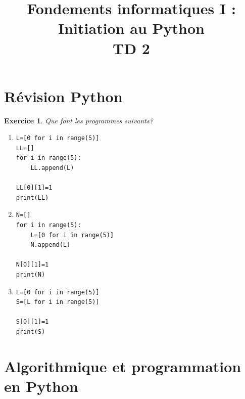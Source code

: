 \documentclass[11pt]{article}
\title{Fondements informatiques I : Initiation au  Python\\
TD 2}
\newcommand{\correction}{
\renewenvironment{note}{
~\hspace*{-0.1cm} \hrulefill\\ \textbf{Notes.}~\\
}
{
~\hspace*{-0.1cm} \hrulefill
}
}
\newtheorem{exercice}{Exercice}[section]
\begin{document}
\date{}
\maketitle


\section{Révision Python}






\bigskip

\begin{exercice}
Que font les programmes suivants?
\begin{enumerate}
\item 
\begin{verbatim}
L=[0 for i in range(5)]
LL=[]
for i in range(5):
    LL.append(L)

LL[0][1]=1
print(LL)    
\end{verbatim}

\item 
\begin{verbatim}
N=[]
for i in range(5):
    L=[0 for i in range(5)]
    N.append(L)

N[0][1]=1
print(N)  
\end{verbatim}

\item 
\begin{verbatim}
L=[0 for i in range(5)]
S=[L for i in range(5)]

S[0][1]=1
print(S)  
\end{verbatim}
\end{enumerate}
\end{exercice}

\section{Algorithmique et programmation en Python}
\end{document}
